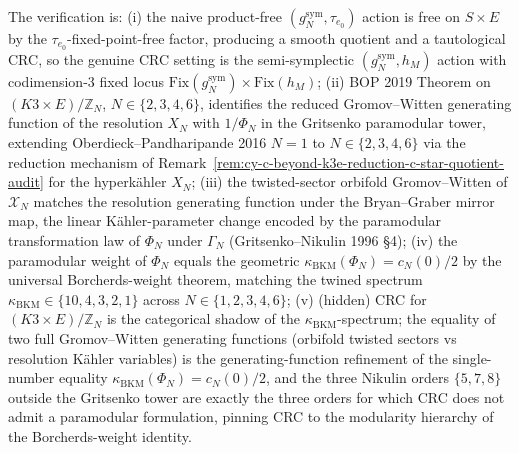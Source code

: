 \begin{remark}
The verification is:
\textup{(i)} the naive product-free $(g_N^{\mathrm{sym}},\tau_{e_0})$
action is free on $S\times E$ by the $\tau_{e_0}$-fixed-point-free
factor, producing a smooth quotient and a tautological CRC, so the
genuine CRC setting is the semi-symplectic
$(g_N^{\mathrm{sym}},h_M)$ action with codimension-$3$ fixed locus
$\mathrm{Fix}(g_N^{\mathrm{sym}})\times\mathrm{Fix}(h_M)$;
\textup{(ii)} BOP 2019 Theorem on $(K3\times E)/\mathbb Z_N$,
$N\in\{2,3,4,6\}$, identifies the reduced Gromov--Witten generating
function of the resolution $X_N$ with $1/\Phi_N$ in the Gritsenko
paramodular tower, extending Oberdieck--Pandharipande 2016 $N=1$ to
$N\in\{2,3,4,6\}$ via the reduction mechanism of
Remark~\ref{rem:cy-c-beyond-k3e-reduction-c-star-quotient-audit} for
the hyperk\"ahler $X_N$;
\textup{(iii)} the twisted-sector orbifold Gromov--Witten of
$\mathcal X_N$ matches the resolution generating function under the
Bryan--Graber mirror map, the linear K\"ahler-parameter change
encoded by the paramodular transformation law of $\Phi_N$ under
$\Gamma_N$ (Gritsenko--Nikulin 1996 \S 4);
\textup{(iv)} the paramodular weight of $\Phi_N$ equals the
geometric $\kappa_{\mathrm{BKM}}(\Phi_N)=c_N(0)/2$ by the universal
Borcherds-weight theorem, matching the twined spectrum
$\kappa_{\mathrm{BKM}}\in\{10,4,3,2,1\}$ across
$N\in\{1,2,3,4,6\}$;
\textup{(v)} (hidden) CRC for $(K3\times E)/\mathbb Z_N$ is the
categorical shadow of the $\kappa_{\mathrm{BKM}}$-spectrum; the
equality of two full Gromov--Witten generating functions (orbifold
twisted sectors vs resolution K\"ahler variables) is the
generating-function refinement of the single-number equality
$\kappa_{\mathrm{BKM}}(\Phi_N)=c_N(0)/2$, and the three Nikulin
orders $\{5,7,8\}$ outside the Gritsenko tower are exactly the three
orders for which CRC does not admit a paramodular formulation,
pinning CRC to the modularity hierarchy of the
Borcherds-weight identity.
\end{remark}

